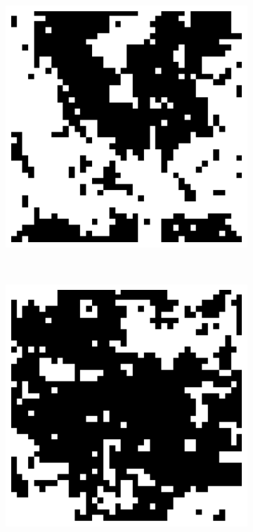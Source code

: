 \documentclass[11pt, a4paper]{report} %
\begin{document}
\begin{figure}[htb]
	\begin{subfigure}[c]{0.2\linewidth}
		\includegraphics[width=\linewidth]{20160603125620_40_by_40_Lattice_step400.pdf}
	\end{subfigure}
	~
	\begin{subfigure}[c]{0.2\linewidth}
		\includegraphics[width=\linewidth]{20160603125628_40_by_40_Lattice_step1000.pdf}

\end{subfigure}
\end{figure}
\end{document}
